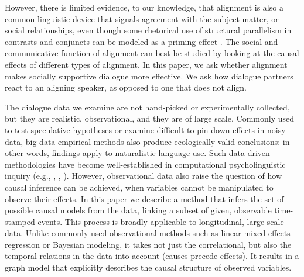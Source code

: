 \documentclass[man,biblatex,floatsintext]{apa6}
\begin{document}

However, there is limited evidence, to our knowledge, that alignment is also a common linguistic device that signals agreement with the subject matter, or social relationships, even though some rhetorical use of structural parallelism in contrasts and conjuncts \parencite{aristotle2015rhetoric} can be modeled as a priming effect \parencite{dubey2008probabilistic}.  The social and communicative function of alignment can best be studied by looking at the causal effects of different types of alignment.  In this paper, we ask whether alignment makes socially supportive dialogue more effective.  We ask how dialogue partners react to an aligning speaker, as opposed to one that does not align.

The dialogue data we examine are not hand-picked or experimentally collected, but they are realistic, observational, and they are of large scale.  Commonly used to test speculative hypotheses or examine difficult-to-pin-down effects in noisy data, big-data empirical methods also produce ecologically valid conclusions: in other words, findings apply to naturalistic language use.  Such data-driven methodologies have become well-established in computational psycholinguistic inquiry (e.g., \cite{gries2005corpusbased}, \cite{jaeger2006speakers}, \cite{reitter2017alignment}).  However, observational data also raise the question of how causal inference can be achieved, when variables cannot be manipulated to observe their effects. In this paper we describe a method that infers  the set of possible causal models from the data, linking a subset of given, observable time-stamped events.    This process is broadly applicable to longitudinal, large-scale data.  Unlike commonly used observational methods such as linear mixed-effects regression or Bayesian modeling, it takes not just the correlational, but also the temporal relations in the data into account (causes precede effects).   It results in a graph model that explicitly describes the causal structure of observed variables.  
\end{document}
